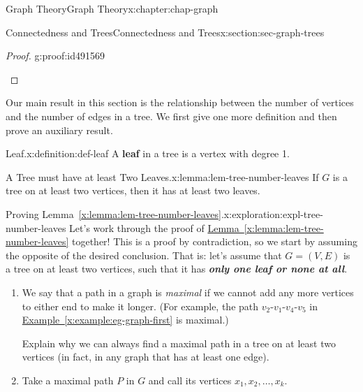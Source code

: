 \documentclass[oneside,10pt,]{book}
\newcommand{\xreffont}{\relax}
\newcommand{\alert}[1]{\textbf{\textit{#1}}}
\newcommand{\terminology}[1]{\textbf{#1}}
\numberwithin{equation}{section}
\begin{document}
\begin{chapterptx}{Graph Theory}{}{Graph Theory}{}{}{x:chapter:chap-graph}
\begin{sectionptx}{Connectedness and Trees}{}{Connectedness and Trees}{}{}{x:section:sec-graph-trees}
\begin{proof}{}{g:proof:id491569}
\begin{sidebyside}{2}{0}{0}{0.07}
\begin{sbspanel}{0.18}
{
}%
\end{sbspanel}%
\end{sidebyside}%
\end{proof}
Our main result in this section is the relationship between the number of vertices and the number of edges in a tree. We first give one more definition and then prove an auxiliary result.%
\begin{definition}{Leaf.}{x:definition:def-leaf}%
A \terminology{leaf} in a tree is a vertex with degree 1.%
\end{definition}
\begin{lemma}{A Tree must have at least Two Leaves.}{}{x:lemma:lem-tree-number-leaves}%
If \(G\) is a tree on at least two vertices, then it has at least two leaves.%
\end{lemma}
\begin{exploration}{Proving Lemma~{\xreffont\ref*{x:lemma:lem-tree-number-leaves}}.}{x:exploration:expl-tree-number-leaves}%
Let's work through the proof of \hyperref[x:lemma:lem-tree-number-leaves]{Lemma~{\xreffont\ref{x:lemma:lem-tree-number-leaves}}} together! This is a proof by contradiction, so we start by assuming the opposite of the desired conclusion. That is: let's assume that \(G = (V,E)\) is a tree on at least two vertices, such that it has \alert{only one leaf or none at all}.%
\begin{enumerate}[font=\bfseries,label=(\alph*),ref=\alph*]
\item{}We say that a path in a graph is \emph{maximal} if we cannot add any more vertices to either end to make it longer. (For example, the path \(v_2\)-\(v_1\)-\(v_4\)-\(v_5\) in \hyperref[x:example:eg-graph-first]{Example~{\xreffont\ref{x:example:eg-graph-first}}} is maximal.)%
\par
Explain why we can always find a maximal path in a tree on at least two vertices (in fact, in any graph that has at least one edge).%
\item{}Take a maximal path \(P\) in \(G\) and call its vertices \(x_1,x_2,\ldots,x_k\).%
\begin{sidebyside}{1}{0.3}{0.3}{0}%

\end{sidebyside}
\end{enumerate}
\end{exploration}
\end{sectionptx}
\end{chapterptx}
\end{document}
